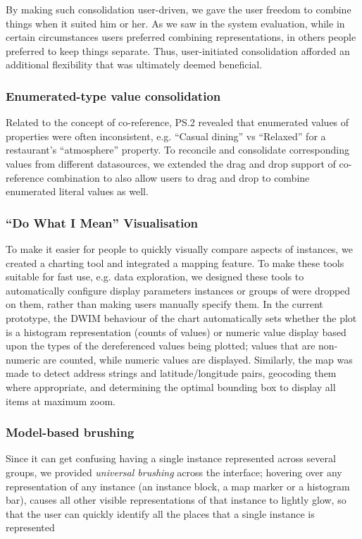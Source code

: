 \documentclass{sigchi}
\begin{document}
By making such consolidation user-driven, we gave the user freedom to combine things when it suited him or her. As we saw in the system evaluation, while in certain circumstances users preferred combining representations, in others people preferred to keep things separate.  Thus, user-initiated consolidation afforded an additional flexibility that was ultimately deemed beneficial.

\subsubsection{Enumerated-type value consolidation}
Related to the concept of co-reference, PS.2 revealed that enumerated values of properties were often inconsistent, e.g. ``Casual dining'' vs ``Relaxed'' for a restaurant's ``atmosphere'' property. To reconcile and consolidate corresponding values from different  datasources, we extended the drag and drop support of co-reference combination to also allow users to drag and drop to combine enumerated literal values as well.  

\subsubsection{``Do What I Mean'' Visualisation}

To make it easier for people to quickly visually compare aspects of instances, we created a charting tool and integrated a mapping feature.  To make these tools suitable for fast use, e.g. data exploration, we designed these tools to automatically configure display parameters instances or groups of were dropped on them, rather than making users manually specify them. In the current prototype, the DWIM behaviour of the chart automatically sets whether the plot is a histogram representation (counts of values) or numeric value display based upon the types of the dereferenced values being plotted; values that are non-numeric are counted, while numeric values are displayed.    Similarly, the map was made to detect address strings and latitude/longitude pairs, geocoding them where appropriate, and determining the optimal bounding box to display all items at maximum zoom.

\subsubsection{Model-based brushing}
Since it can get confusing having a single instance represented across several groups, we provided \emph{universal brushing} across the interface; hovering over any representation of any instance (an instance block, a map marker or a histogram bar), causes all other visible representations of that instance to lightly glow, so that the user can quickly identify all the places that a single instance is represented
\end{document}
